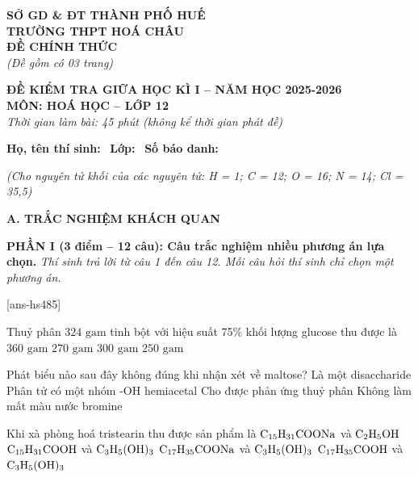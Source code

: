 \documentclass[12pt,a4paper]{article}
\begin{document}
\thispagestyle{firstpage}

\noindent
\begin{minipage}[t]{0.42\textwidth}
	\centering\fontsize{10pt}{12pt}\selectfont
	\textbf{SỞ GD \& ĐT THÀNH PHỐ HUẾ}\\
	\textbf{TRƯỜNG THPT HOÁ CHÂU}\\
	\textbf{ĐỀ CHÍNH THỨC}\\
	\textit{(Đề gồm có 03 trang)}
\end{minipage}\hfill
\begin{minipage}[t]{0.56\textwidth}
	\centering\small
	\textbf{ĐỀ KIỂM TRA GIỮA HỌC KÌ I – NĂM HỌC 2025-2026}\\
	\textbf{MÔN: HOÁ HỌC – LỚP 12}\\
	\textit{Thời gian làm bài: 45 phút (không kể thời gian phát đề)}\\
\end{minipage}

\smallskip
\noindent\hrulefill
\smallskip

\noindent\textbf{Họ, tên thí sinh:} \dotfill\ \textbf{Lớp:} \dotfill\ \textbf{Số báo danh:} \dotfill

\smallskip
\noindent\textit{(Cho nguyên tử khối của các nguyên tử: H = 1; C = 12; O = 16; N = 14; Cl = 35,5)}
\smallskip

\noindent
\textbf{A. TRẮC NGHIỆM KHÁCH QUAN}

\smallskip
\noindent
\textbf{PHẦN I (3 điểm -- 12 câu): Câu trắc nghiệm nhiều phương án lựa chọn.} \textit{Thí sinh trả lời từ câu 1 đến câu 12. Mỗi câu hỏi thí sinh chỉ chọn một phương án.}

[ans-hs485]

\begin{ex}
Thuỷ phân $324\text{ gam}$ tinh bột với hiệu suất 75\% khối lượng glucose thu được là
\choice
{$360\text{ gam}$}
{\True $270\text{ gam}$}
{$300\text{ gam}$}
{$250\text{ gam}$}
\loigiai{}
\end{ex}

\begin{ex}
Phát biểu nào sau đây không đúng khi nhận xét về maltose?
\choice
{Là một disaccharide}
{Phân tử có một nhóm -OH hemiacetal}
{Cho được phản ứng thuỷ phân}
{\True Không làm mất màu nước bromine}
\loigiai{}
\end{ex}

\begin{ex}
Khi xà phòng hoá tristearin thu được sản phẩm là
\choice
{$\ce{C15H31COONa}$ và $\ce{C2H5OH}$}
{$\ce{C15H31COOH}$ và $\ce{C3H5(OH)3}$}
{\True $\ce{C17H35COONa}$ và $\ce{C3H5(OH)3}$}
{$\ce{C17H35COOH}$ và $\ce{C3H5(OH)3}$}
\loigiai{}
\end{ex}
\end{document}
